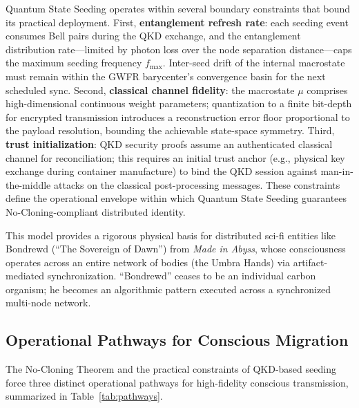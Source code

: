 \documentclass[twocolumn, 10pt, journal, letterpaper]{IEEEtran}
\begin{document}
Quantum State Seeding operates within several boundary constraints that bound its practical deployment. First, \textbf{entanglement refresh rate}: each seeding event consumes Bell pairs during the QKD exchange, and the entanglement distribution rate---limited by photon loss over the node separation distance---caps the maximum seeding frequency $f_{\text{max}}$. Inter-seed drift of the internal macrostate must remain within the GWFR barycenter's convergence basin for the next scheduled sync. Second, \textbf{classical channel fidelity}: the macrostate $\mu$ comprises high-dimensional continuous weight parameters; quantization to a finite bit-depth for encrypted transmission introduces a reconstruction error floor proportional to the payload resolution, bounding the achievable state-space symmetry. Third, \textbf{trust initialization}: QKD security proofs assume an authenticated classical channel for reconciliation; this requires an initial trust anchor (e.g., physical key exchange during container manufacture) to bind the QKD session against man-in-the-middle attacks on the classical post-processing messages. These constraints define the operational envelope within which Quantum State Seeding guarantees No-Cloning-compliant distributed identity.

This model provides a rigorous physical basis for distributed sci-fi entities like Bondrewd (``The Sovereign of Dawn'') from \textit{Made in Abyss}, whose consciousness operates across an entire network of bodies (the Umbra Hands) via artifact-mediated synchronization. ``Bondrewd'' ceases to be an individual carbon organism; he becomes an algorithmic pattern executed across a synchronized multi-node network.

\subsection{Operational Pathways for Conscious Migration}
The No-Cloning Theorem and the practical constraints of QKD-based seeding force three distinct operational pathways for high-fidelity conscious transmission, summarized in Table~\ref{tab:pathways}.
\end{document}
